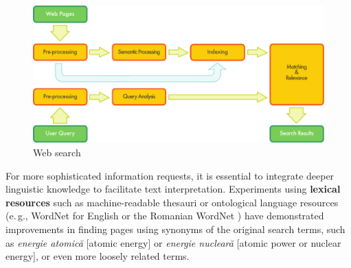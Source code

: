 \begin{multicols}{2}
\begin{figure}[htb]
  \center
  \includegraphics[width=\textwidth]{../_media/english/web_search_architecture}
  \caption{Web search}
  \label{fig:websearcharch_en}
  \vspace{-15mm}
 \end{figure}

For more sophisticated information requests, it is essential to integrate deeper linguistic knowledge to facilitate text interpretation. Experiments using \textbf{lexical resources} such as machine-readable thesauri or ontological language resources (e.\,g., WordNet for English or the Romanian WordNet \cite{WN}) have demonstrated improvements in finding pages using synonyms of the original search terms, such as \textit{energie atomică} {[}atomic energy{]} or \textit{energie nucleară} {[}atomic power or nuclear energy{]}, or even more loosely related terms.



\end{multicols}
